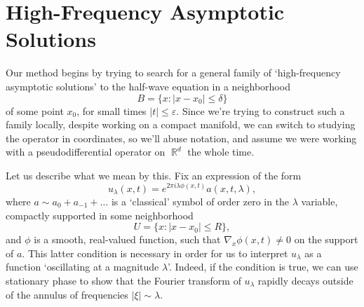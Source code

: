 \documentclass{article}
\theoremstyle{plain}
\theoremstyle{remark}
\theoremstyle{definition}
\DeclareMathOperator{\RR}{\mathbb{R}}
\begin{document}

\section{High-Frequency Asymptotic Solutions}

Our method begins by trying to search for a general family of `high-frequency asymptotic solutions' to the half-wave equation in a neighborhood
%
\[ B = \{ x : |x - x_0| \leq \delta \} \]
%
of some point $x_0$, for small times $|t| \leq \varepsilon$. Since we're trying to construct such a family locally, despite working on a compact manifold, we can switch to studying the operator in coordinates, so we'll abuse notation, and assume we were working with a pseudodifferential operator on $\RR^d$ the whole time.

Let us describe what we mean by this. Fix an expression of the form
%
\[ u_\lambda(x,t) = e^{2 \pi i \lambda \phi(x,t)} a(x,t,\lambda), \]
%
where $a \sim a_0 + a_{-1} + \dots$ is a `classical' symbol of order zero in the $\lambda$ variable, compactly supported in some neighborhood
%
\[ U = \{ x : |x - x_0| \leq R \}, \]
%
and $\phi$ is a smooth, real-valued function, such that $\nabla_x \phi(x,t) \neq 0$ on the support of $a$. This latter condition is necessary in order for us to interpret $u_\lambda$ as a function `oscillating at a magnitude $\lambda$'. Indeed, if the condition is true, we can use stationary phase to show that the Fourier transform of $u_\lambda$ rapidly decays outside of the annulus of frequencies $|\xi| \sim \lambda$.

%

%
%
%
\end{document}

